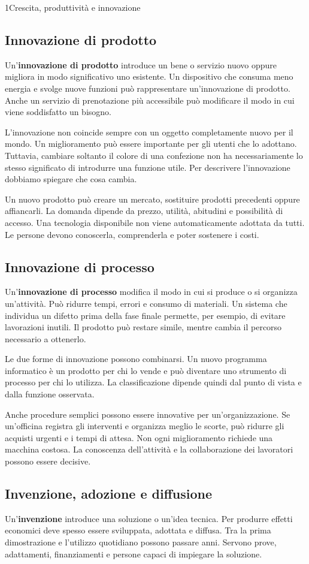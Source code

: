 \begin{lettura}{1}{Crescita, produttività e innovazione}
\subsection*{Innovazione di prodotto}
Un'\textbf{innovazione di prodotto} introduce un bene o servizio nuovo oppure migliora in modo significativo uno esistente. Un dispositivo che consuma meno energia e svolge nuove funzioni può rappresentare un'innovazione di prodotto. Anche un servizio di prenotazione più accessibile può modificare il modo in cui viene soddisfatto un bisogno.

L'innovazione non coincide sempre con un oggetto completamente nuovo per il mondo. Un miglioramento può essere importante per gli utenti che lo adottano. Tuttavia, cambiare soltanto il colore di una confezione non ha necessariamente lo stesso significato di introdurre una funzione utile. Per descrivere l'innovazione dobbiamo spiegare che cosa cambia.

Un nuovo prodotto può creare un mercato, sostituire prodotti precedenti oppure affiancarli. La domanda dipende da prezzo, utilità, abitudini e possibilità di accesso. Una tecnologia disponibile non viene automaticamente adottata da tutti. Le persone devono conoscerla, comprenderla e poter sostenere i costi.

\subsection*{Innovazione di processo}
Un'\textbf{innovazione di processo} modifica il modo in cui si produce o si organizza un'attività. Può ridurre tempi, errori e consumo di materiali. Un sistema che individua un difetto prima della fase finale permette, per esempio, di evitare lavorazioni inutili. Il prodotto può restare simile, mentre cambia il percorso necessario a ottenerlo.

Le due forme di innovazione possono combinarsi. Un nuovo programma informatico è un prodotto per chi lo vende e può diventare uno strumento di processo per chi lo utilizza. La classificazione dipende quindi dal punto di vista e dalla funzione osservata.

Anche procedure semplici possono essere innovative per un'organizzazione. Se un'officina registra gli interventi e organizza meglio le scorte, può ridurre gli acquisti urgenti e i tempi di attesa. Non ogni miglioramento richiede una macchina costosa. La conoscenza dell'attività e la collaborazione dei lavoratori possono essere decisive.

\subsection*{Invenzione, adozione e diffusione}
Un'\textbf{invenzione} introduce una soluzione o un'idea tecnica. Per produrre effetti economici deve spesso essere sviluppata, adottata e diffusa. Tra la prima dimostrazione e l'utilizzo quotidiano possono passare anni. Servono prove, adattamenti, finanziamenti e persone capaci di impiegare la soluzione.


\end{lettura}
